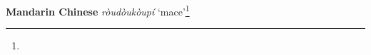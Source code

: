 \begin{etymology}\label{ety:roudoukoupi}
\textbf{Mandarin Chinese}  \textit{ròudòukòupí} `mace'\footnote{}
\end{etymology}